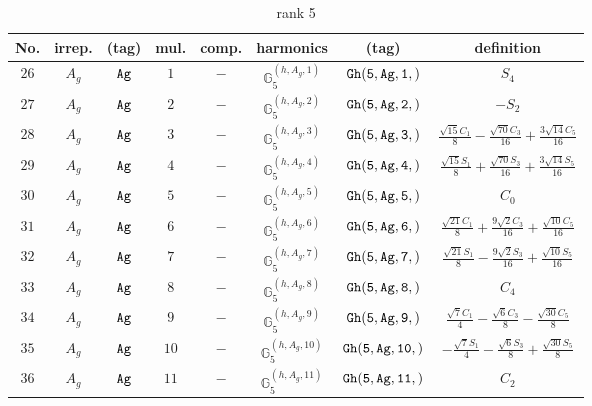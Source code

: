 \documentclass[fleqn,8pt]{jsarticle}
\begin{document}
\begin{table}[ht!]
\begin{center}
\caption{rank 5}
\renewcommand{\arraystretch}{1.3}
\begin{tabular}{cccccccc} \hline \hline
No. & irrep. & (tag) & mul. & comp. & harmonics & (tag) & definition \\ \hline
$ 26 $ & $ A_{g} $ & $ {\tt Ag} $ & $ 1 $ & $ - $ & $ \mathbb{G}_{5}^{(h,A_{g},1)} $ & $ {\tt Gh(5,Ag,1,)} $ & $ S_{4} $ \\
$ 27 $ & $ A_{g} $ & $ {\tt Ag} $ & $ 2 $ & $ - $ & $ \mathbb{G}_{5}^{(h,A_{g},2)} $ & $ {\tt Gh(5,Ag,2,)} $ & $ - S_{2} $ \\
$ 28 $ & $ A_{g} $ & $ {\tt Ag} $ & $ 3 $ & $ - $ & $ \mathbb{G}_{5}^{(h,A_{g},3)} $ & $ {\tt Gh(5,Ag,3,)} $ & $ \frac{\sqrt{15} C_{1}}{8} - \frac{\sqrt{70} C_{3}}{16} + \frac{3 \sqrt{14} C_{5}}{16} $ \\
$ 29 $ & $ A_{g} $ & $ {\tt Ag} $ & $ 4 $ & $ - $ & $ \mathbb{G}_{5}^{(h,A_{g},4)} $ & $ {\tt Gh(5,Ag,4,)} $ & $ \frac{\sqrt{15} S_{1}}{8} + \frac{\sqrt{70} S_{3}}{16} + \frac{3 \sqrt{14} S_{5}}{16} $ \\
$ 30 $ & $ A_{g} $ & $ {\tt Ag} $ & $ 5 $ & $ - $ & $ \mathbb{G}_{5}^{(h,A_{g},5)} $ & $ {\tt Gh(5,Ag,5,)} $ & $ C_{0} $ \\
$ 31 $ & $ A_{g} $ & $ {\tt Ag} $ & $ 6 $ & $ - $ & $ \mathbb{G}_{5}^{(h,A_{g},6)} $ & $ {\tt Gh(5,Ag,6,)} $ & $ \frac{\sqrt{21} C_{1}}{8} + \frac{9 \sqrt{2} C_{3}}{16} + \frac{\sqrt{10} C_{5}}{16} $ \\
$ 32 $ & $ A_{g} $ & $ {\tt Ag} $ & $ 7 $ & $ - $ & $ \mathbb{G}_{5}^{(h,A_{g},7)} $ & $ {\tt Gh(5,Ag,7,)} $ & $ \frac{\sqrt{21} S_{1}}{8} - \frac{9 \sqrt{2} S_{3}}{16} + \frac{\sqrt{10} S_{5}}{16} $ \\
$ 33 $ & $ A_{g} $ & $ {\tt Ag} $ & $ 8 $ & $ - $ & $ \mathbb{G}_{5}^{(h,A_{g},8)} $ & $ {\tt Gh(5,Ag,8,)} $ & $ C_{4} $ \\
$ 34 $ & $ A_{g} $ & $ {\tt Ag} $ & $ 9 $ & $ - $ & $ \mathbb{G}_{5}^{(h,A_{g},9)} $ & $ {\tt Gh(5,Ag,9,)} $ & $ \frac{\sqrt{7} C_{1}}{4} - \frac{\sqrt{6} C_{3}}{8} - \frac{\sqrt{30} C_{5}}{8} $ \\
$ 35 $ & $ A_{g} $ & $ {\tt Ag} $ & $ 10 $ & $ - $ & $ \mathbb{G}_{5}^{(h,A_{g},10)} $ & $ {\tt Gh(5,Ag,10,)} $ & $ - \frac{\sqrt{7} S_{1}}{4} - \frac{\sqrt{6} S_{3}}{8} + \frac{\sqrt{30} S_{5}}{8} $ \\
$ 36 $ & $ A_{g} $ & $ {\tt Ag} $ & $ 11 $ & $ - $ & $ \mathbb{G}_{5}^{(h,A_{g},11)} $ & $ {\tt Gh(5,Ag,11,)} $ & $ C_{2} $ \\
 \hline \hline
\end{tabular}
\end{center}
\end{table}
\end{document}
